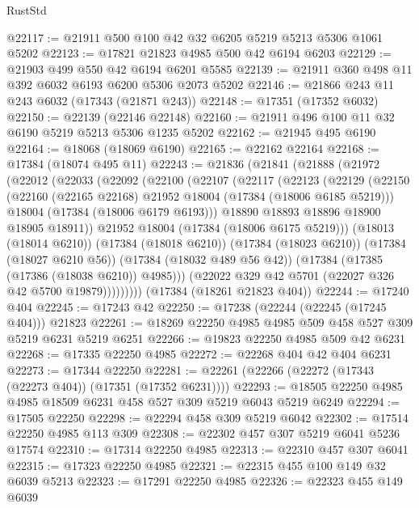 \begin{lexlean}{RustStd}
\begin{coremodule}
@22117 := @21911 @500 @100 @42 @32 @6205 @5219 @5213 @5306 @1061 @5202
@22123 := @17821 @21823 @4985 @500 @42 @6194 @6203
@22129 := @21903 @499 @550 @42 @6194 @6201 @5585
@22139 := @21911 @360 @498 @11 @392 @6032 @6193 @6200 @5306 @2073 @5202
@22146 := @21866 @243 @11 @243 @6032 (@17343 (@21871 @243))
@22148 := @17351 (@17352 @6032)
@22150 := @22139 (@22146 @22148)
@22160 := @21911 @496 @100 @11 @32 @6190 @5219 @5213 @5306 @1235 @5202
@22162 := @21945 @495 @6190
@22164 := @18068 (@18069 @6190)
@22165 := @22162 @22164
@22168 := @17384 (@18074 @495 @11)
@22243 := @21836
    (@21841
      (@21888
        (@21972
          (@22012
            (@22033
              (@22092
                (@22100
                  (@22107
                    (@22117
                      (@22123
                        (@22129
                          (@22150
                            (@22160 (@22165 @22168) @21952 @18004 (@17384 (@18006 @6185 @5219)))
                            @18004
                            (@17384 (@18006 @6179 @6193)))
                          @18890
                          @18893
                          @18896
                          @18900
                          @18905
                          @18911))
                      @21952
                      @18004
                      (@17384 (@18006 @6175 @5219)))
                    (@18013 (@18014 @6210))
                    (@17384 (@18018 @6210))
                    (@17384 (@18023 @6210))
                    (@17384 (@18027 @6210 @56))
                    (@17384 (@18032 @489 @56 @42))
                    (@17384 (@17385 (@17386 (@18038 @6210)) @4985)))
                  (@22022 @329 @42 @5701 (@22027 @326 @42 @5700 @19879)))))))))
    (@17384 (@18261 @21823 @404))
@22244 := @17240 @404
@22245 := @17243 @42
@22250 := @17238 (@22244 (@22245 (@17245 @404))) @21823
@22261 := @18269 @22250 @4985 @4985 @509 @458 @527 @309 @5219 @6231 @5219 @6251
@22266 := @19823 @22250 @4985 @509 @42 @6231
@22268 := @17335 @22250 @4985
@22272 := @22268 @404 @42 @404 @6231
@22273 := @17344 @22250
@22281 := @22261 (@22266 (@22272 (@17343 (@22273 @404)) (@17351 (@17352 @6231))))
@22293 := @18505 @22250 @4985 @4985 @18509 @6231 @458 @527 @309 @5219 @6043 @5219 @6249
@22294 := @17505 @22250
@22298 := @22294 @458 @309 @5219 @6042
@22302 := @17514 @22250 @4985 @113 @309
@22308 := @22302 @457 @307 @5219 @6041 @5236 @17574
@22310 := @17314 @22250 @4985
@22313 := @22310 @457 @307 @6041
@22315 := @17323 @22250 @4985
@22321 := @22315 @455 @100 @149 @32 @6039 @5213
@22323 := @17291 @22250 @4985
@22326 := @22323 @455 @149 @6039

\end{coremodule}
\end{lexlean}
